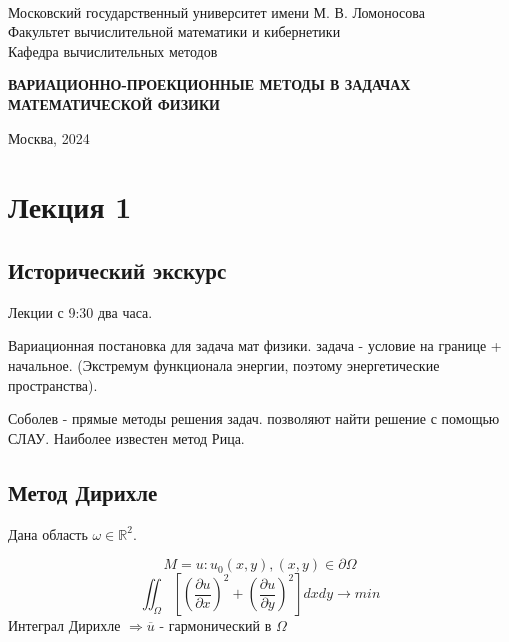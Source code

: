 \documentclass[12pt, a4paper]{article}
\begin{document}
\thispagestyle{empty}

\begin{center}
	\ \vspace{-1cm}
	
	{Московский государственный университет имени М. В. Ломоносова}\\
	Факультет вычислительной математики и кибернетики\\
	Кафедра вычислительных методов
	
	\vspace{8cm}
	\begin{spacing}{2.5}
		{\huge \bfseries ВАРИАЦИОННО-ПРОЕКЦИОННЫЕ МЕТОДЫ В ЗАДАЧАХ МАТЕМАТИЧЕСКОЙ ФИЗИКИ}
	\end{spacing}
	

\end{center}

\vfill

\begin{center}
	Москва, 2024
\end{center}

\enlargethispage{2\baselineskip}

\newpage

\tableofcontents

\newpage

\section{Лекция 1}

\subsection{Исторический экскурс}

Лекции с 9:30 два часа.

Вариационная постановка для задача мат физики.
задача - условие на границе + начальное. (Экстремум функционала энергии, поэтому энергетические пространства).

Соболев - прямые методы решения задач. позволяют найти решение с помощью СЛАУ. Наиболее известен метод Рица.

\subsection{Метод Дирихле}

Дана область $ \omega \in \mathbb{R}^2$.

\[ M = {u:u_{0}(x,y), (x,y) \in \partial \Omega} \]
\[ \iint_{\Omega}[{(\frac{\partial u}{\partial x})}^2+{(\frac{\partial u}{\partial y})}^2] dx dy \rightarrow min \]
Интеграл Дирихле $ \Rightarrow \overline{u} $ - гармонический в $ \Omega $
\end{document}
